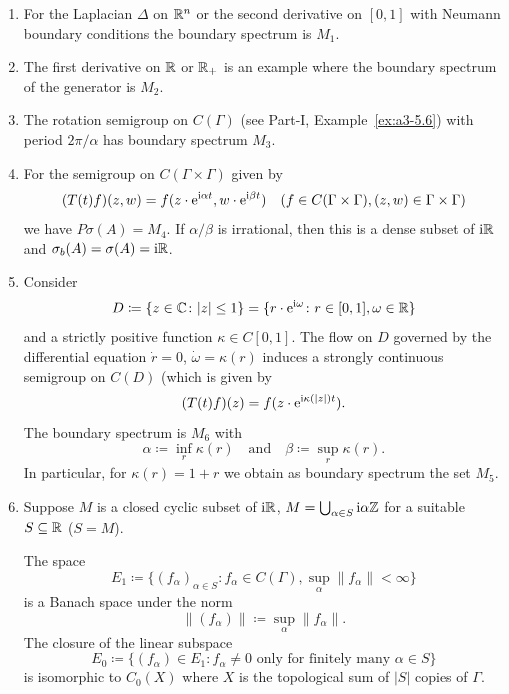 \begin{examples}\label{ex:b3-2.6}%
\begin{enumerate}[\upshape (i), wide, labelindent=.25em]
\item
For the Laplacian 
 $\Delta$ on $\mathbb{R}^{n}$ or the second derivative on $[0,1]$ with Neumann boundary conditions the boundary spectrum is $M_{1}$.
	
\item
The first derivative on $\mathbb{R}$ or $\mathbb{R}_{+}$ is an example where the boundary spectrum of the generator is $M_{2}$.
	
\item
The rotation semigroup%
 on $C(\Gamma)$ (see Part-I, Example~\ref{ex:a3-5.6}) with period $2\pi/\alpha$ has boundary spectrum $M_{3}$.

\item
For the semigroup on $C(\Gamma \times \Gamma)$ given by
	\[
	(T(t)f)(z,w) = f(z\cdot \mathrm{e}^{\mathrm{i}\alpha t},w\cdot \mathrm{e}^{\mathrm{i}\beta  t}) \quad (f \in C(\Gamma \times \Gamma), (z,w) \in \Gamma \times \Gamma)
	\]
	we have $P\sigma(A) = M_{4}$.
	If\/ $\alpha/\beta$ is irrational, then this is a dense subset of\/ $\mathrm{i} \mathbb{R}$ and $\sigma_{b}(A) = \sigma(A) = \mathrm{i}\mathbb{R}$.
	
\item
Consider %
\[
	D \coloneq \{z \in \C \colon |z| \leq 1\} = \{r\cdot \eu^{\im\omega} \colon r \in [0,1], \omega \in \R\} 
\]
%
and a strictly positive function $\kappa \in C[0,1]$.
The flow on $D$ governed by the differential equation $\dot{r} = 0$, $\dot{\omega} = \kappa(r)$ induces a strongly continuous semigroup on $C(D)$ (which is given by
\[
	(T(t)f)(z) = f(z\cdot \mathrm{e}^{\mathrm{i}\kappa(|z|)t}).
\]
The boundary spectrum is $M_{6}$ with 
%
\[
	\alpha \coloneq \inf_r \kappa(r) 
	\quad \text{and} \quad 
	\beta \coloneq \sup_r \kappa(r).
\]
%
In particular, for $\kappa(r) = 1 + r$ we obtain as boundary spectrum the set $M_{5}$.
	
\item
Suppose $M$ is a closed cyclic subset of\/ $\mathrm{i} \mathbb{R}$, $M = \bigcup_{\alpha \in S} \mathrm{i}\alpha\mathbb{Z}$ for a suitable $S \subseteq \mathbb{R}$ (\eg $S = M$).
	
The space 
\[
E_{1} \coloneq \{(f_{\alpha})_{\alpha \in S} \colon f_{\alpha} \in C(\Gamma), \sup_\alpha \|f_{\alpha}\| < \infty\}
\] 
is a Banach space under the norm 
\[
\|(f_{\alpha})\| \coloneq \sup_\alpha \|f_{\alpha}\| .
\]
The closure of the linear subspace 
\[
E_{0} \coloneq \{(f_{\alpha}) \in E_{1} \colon f_{\alpha} \neq 0 \text{ only for finitely many } \alpha \in S\}
\]
is isomorphic to $C_{0}(X)$ where $X$ is the topological sum of\/ $|S|$ copies of\/ $\Gamma$.
	

\end{enumerate}
\end{examples}

